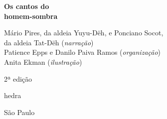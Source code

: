 




\begingroup\thispagestyle{empty}\vspace*{.05\textheight} 

              {\formular
              \huge
              \noindent
              \textbf{Os cantos do\\ 
              homem-sombra}\\
              
              \vspace{-0.5cm}
              
              }

              \vfill              

              {\small
              \noindent{}Mário Pires, da aldeia Yuyu-Dëh, e Ponciano Socot,\\ 
              da aldeia Tat-Dëh (\textit{narração})\vspace{0.2cm}\\
              \noindent{}Patience Epps e Danilo Paiva Ramos (\textit{organização})\vspace{0.2cm}\\
              \noindent{}Anita Ekman (\textit{ilustração})
              }

              \vspace{0.5cm}

              {\small\noindent{}2ª edição}

              \vfill
              
              \newfontfamily{}
              {\noindent\fontsize{30}{40}\selectfont \timesnewroman hedra}

              {\selectfont\small\noindent São Paulo \quad\the\year}

\endgroup
\pagebreak